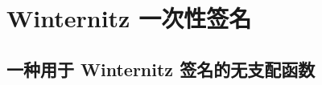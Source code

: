 \section{Winternitz 一次性签名}\label{sec:14-3}

\begin{definition}\label{def:14-4}
	
\end{definition}

\begin{game}[$d$ 次迭代的单向性]\label{game:14-1}
	
\end{game}

\begin{definition}\label{def:14-5}
	
\end{definition}

\begin{theorem}\label{theo:14-4}
	
\end{theorem}

\subsection{一种用于 Winternitz 签名的无支配函数}\label{subsec:14-3-1}

\begin{lemma}\label{lemma:14-5}
	
\end{lemma}